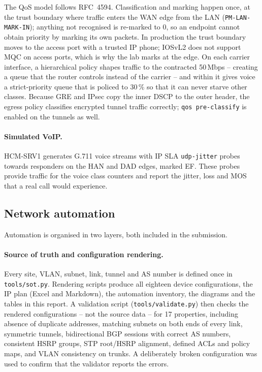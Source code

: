 \documentclass[11pt,a4paper]{article}
\begin{document}
The QoS model follows RFC~4594. Classification and marking happen once, at the trust boundary where traffic enters the WAN edge from the LAN (\texttt{PM-LAN-MARK-IN}); anything not recognised is re-marked to 0, so an endpoint cannot obtain priority by marking its own packets. In production the trust boundary moves to the access port with a trusted IP phone; IOSvL2 does not support MQC on access ports, which is why the lab marks at the edge. On each carrier interface, a hierarchical policy shapes traffic to the contracted 50\,Mbps -- creating a queue that the router controls instead of the carrier -- and within it gives voice a strict-priority queue that is policed to 30\,\% so that it can never starve other classes. Because GRE and IPsec copy the inner DSCP to the outer header, the egress policy classifies encrypted tunnel traffic correctly; \texttt{qos pre-classify} is enabled on the tunnels as well.



\paragraph{Simulated VoIP.} HCM-SRV1 generates G.711 voice streams with IP SLA \texttt{udp-jitter} probes towards responders on the HAN and DAD edges, marked EF. These probes provide traffic for the voice class counters and report the jitter, loss and MOS that a real call would experience.



\subsection{Network automation}
\label{sec:auto}

Automation is organised in two layers, both included in the submission.

\paragraph{Source of truth and configuration rendering.} Every site, VLAN, subnet, link, tunnel and AS number is defined once in \texttt{tools/sot.py}. Rendering scripts produce all eighteen device configurations, the IP plan (Excel and Markdown), the automation inventory, the diagrams and the tables in this report. A validation script (\texttt{tools/validate.py}) then checks the rendered configurations -- not the source data -- for 17 properties, including absence of duplicate addresses, matching subnets on both ends of every link, symmetric tunnels, bidirectional BGP sessions with correct AS numbers, consistent HSRP groups, STP root/HSRP alignment, defined ACLs and policy maps, and VLAN consistency on trunks. A deliberately broken configuration was used to confirm that the validator reports the errors.
\end{document}
